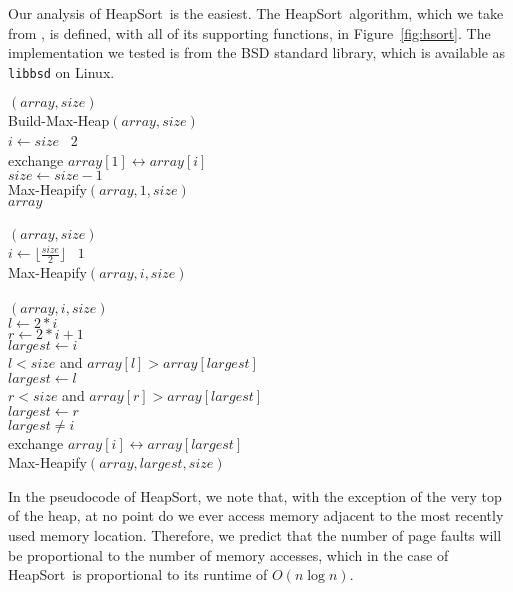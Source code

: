 \documentclass{acmtrans2m}
\newcommand{\heapsort}{{\sc HeapSort}}
\begin{document}
Our analysis of \heapsort\ is the easiest.  The \heapsort\ algorithm, which we
take from , is defined, with all of its supporting functions, in
Figure~\ref{fig:hsort}.  The implementation we tested is from the BSD standard
library, which is available as {\tt libbsd} on Linux.

\begin{narrowfig}{1.5in}
\begin{algorithm}
$(array, size)$\+\\
    Build-Max-Heap$(array, size)$\\
    \For $i \gets size$ \DownTo\ $2$\+\\
        exchange $array[1] \leftrightarrow array[i]$\\
        $size \gets size - 1$\\
        Max-Heapify$(array, 1, size)$\-\\
    \Return $array$\-\\
\\
$(array, size)$\+\\
    \For $i \gets \lfloor \frac{size}{2} \rfloor$ \DownTo\ $1$\+\\
        Max-Heapify$(array, i, size)$\-\-\\
\\
$(array, i, size)$\+\\
    $l \gets 2*i$\\
    $r \gets 2*i + 1$\\
    $largest \gets i$\\
    \If $l < size$ and $array[l] > array[largest]$\+\\
            $largest \gets l$\-\\
    \If $r < size$ and $array[r] > array[largest]$\+\\
            $largest \gets r$\-\\
    \If $largest \neq i$\+\\
        exchange $array[i] \leftrightarrow array[largest]$\\
        Max-Heapify$(array, largest, size)$
\end{algorithm}

\caption{\heapsort\ pseudo code.}
\label{fig:hsort}
\end{narrowfig}

In the pseudocode of \heapsort, we note that, with the exception of the very
top of the heap, at no point do we ever access memory adjacent to the most
recently used memory location.  Therefore, we predict that the number of page
faults will be proportional to the number of memory accesses, which in the case
of \heapsort\ is proportional to its runtime of $O(n \log n)$.
\end{document}
